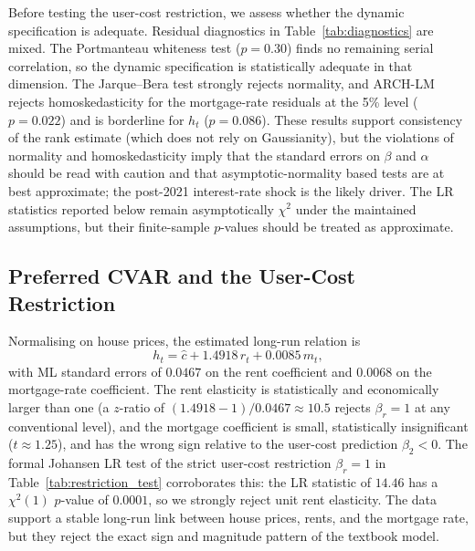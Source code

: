 \documentclass[12pt]{article}
\begin{document}
Before testing the user-cost restriction, we assess whether the dynamic specification is adequate. Residual diagnostics in Table~\ref{tab:diagnostics} are mixed. The Portmanteau whiteness test ($p=0.30$) finds no remaining serial correlation, so the dynamic specification is statistically adequate in that dimension. The Jarque--Bera test strongly rejects normality, and ARCH-LM rejects homoskedasticity for the mortgage-rate residuals at the 5\% level ($p=0.022$) and is borderline for $h_t$ ($p=0.086$). These results support consistency of the rank estimate (which does not rely on Gaussianity), but the violations of normality and homoskedasticity imply that the standard errors on $\beta$ and $\alpha$ should be read with caution and that asymptotic-normality based tests are at best approximate; the post-2021 interest-rate shock is the likely driver. The LR statistics reported below remain asymptotically $\chi^2$ under the maintained assumptions, but their finite-sample $p$-values should be treated as approximate.



\subsection{Preferred CVAR and the User-Cost Restriction}

Normalising on house prices, the estimated long-run relation is
\begin{equation}
	h_t = \hat c + 1.4918\,r_t + 0.0085\,m_t,
\end{equation}
with ML standard errors of $0.0467$ on the rent coefficient and $0.0068$ on the mortgage-rate coefficient. The rent elasticity is statistically and economically larger than one (a $z$-ratio of $(1.4918-1)/0.0467 \approx 10.5$ rejects $\beta_r=1$ at any conventional level), and the mortgage coefficient is small, statistically insignificant ($t\approx 1.25$), and has the wrong sign relative to the user-cost prediction $\beta_2<0$. The formal Johansen LR test of the strict user-cost restriction $\beta_r=1$ in Table~\ref{tab:restriction_test} corroborates this: the LR statistic of $14.46$ has a $\chi^2(1)$ $p$-value of $0.0001$, so we strongly reject unit rent elasticity. The data support a stable long-run link between house prices, rents, and the mortgage rate, but they reject the exact sign and magnitude pattern of the textbook model.
\end{document}
